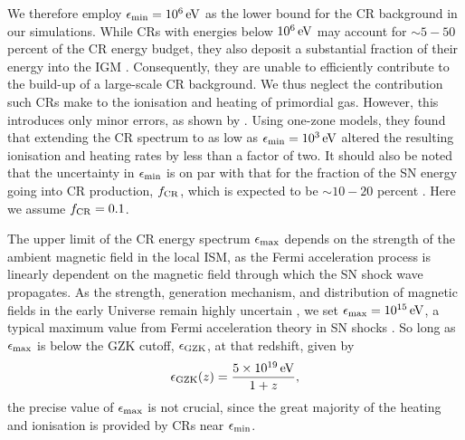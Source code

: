 \documentclass[usenatbib]{mn2e}
\newcommand{\ev}{\,{\rm eV}}
\begin{document}
We therefore employ $\epsilon_{\rm min} = 10^6\ev$ as the lower bound for the CR background in our simulations.  
While CRs with energies below $10^6\ev$ may account for $\sim$$5-50$ percent of the CR energy budget, they also deposit a substantial fraction of their energy into the IGM \citep{SazonovSunyaev2015}. 
Consequently, they are unable to efficiently contribute to the build-up of a large-scale CR background. We thus neglect the contribution such CRs make to the ionisation and heating of primordial gas. 
However, this introduces only minor errors, as shown by \citet{StacyBromm2007}. Using one-zone models, they found that extending the CR spectrum to as low as $\epsilon_{\rm min} = 10^3\ev$ altered the resulting ionisation and heating rates by less than a factor of two.  
It should also be noted that the uncertainty in $\epsilon_{\rm min}$ is on par with that for the fraction of the SN energy going into CR production, $f_{\rm \small CR}$, which is expected to be $\sim$$10-20$ percent \citep{CaprioliSpitkovsky2014}.  
Here we assume $f_{\rm \small CR} = 0.1$.

The upper limit of the CR energy spectrum $\epsilon_{\rm max}$ depends on the strength of the ambient magnetic field in the local ISM, as the Fermi acceleration process is linearly dependent on the magnetic field through which the SN shock wave propagates. 
As the strength, generation mechanism, and distribution of magnetic fields in the early Universe remain highly uncertain \citep{DurrerNeronov2013}, we set $\epsilon_{\rm max} = 10^{15}\ev$, a typical maximum value from Fermi acceleration theory in SN shocks \citep[e.g.,][]{BlandfordEichler1987}.  
So long as $\epsilon_{\rm max}$ is below the GZK cutoff, $\epsilon_{\rm \small GZK}$, at that redshift, given by \citep{StacyBromm2007}
\begin{equation}
\epsilon_{\rm \small GZK}(z) = \frac{5\times10^{19}\ev}{1+z},
\end{equation}
the precise value of $\epsilon_{\rm max}$ is not crucial, since the great majority of the heating and ionisation is provided by CRs near $\epsilon_{\rm min}$.
\end{document}
